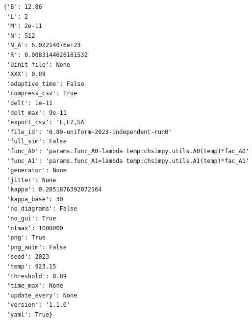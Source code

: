 \documentclass{scrartcl}\usepackage{graphicx,booktabs}\newcommand{\randA}{\widetilde{A}}
\begin{document}
\begin{verbatim}{'B': 12.86
 'L': 2
 'M': 2e-11
 'N': 512
 'N_A': 6.02214076e+23
 'R': 0.0083144626181532
 'Uinit_file': None
 'XXX': 0.89
 'adaptive_time': False
 'compress_csv': True
 'delt': 1e-11
 'delt_max': 9e-11
 'export_csv': 'E,E2,SA'
 'file_id': '0.89-uniform-2023-independent-run0'
 'full_sim': False
 'func_A0': 'params.func_A0=lambda temp:chsimpy.utils.A0(temp)*fac_A0'
 'func_A1': 'params.func_A1=lambda temp:chsimpy.utils.A1(temp)*fac_A1'
 'generator': None
 'jitter': None
 'kappa': 0.2851876392072164
 'kappa_base': 30
 'no_diagrams': False
 'no_gui': True
 'ntmax': 1000000
 'png': True
 'png_anim': False
 'seed': 2023
 'temp': 923.15
 'threshold': 0.89
 'time_max': None
 'update_every': None
 'version': '1.1.0'
 'yaml': True}\end{verbatim}
\end{document}

